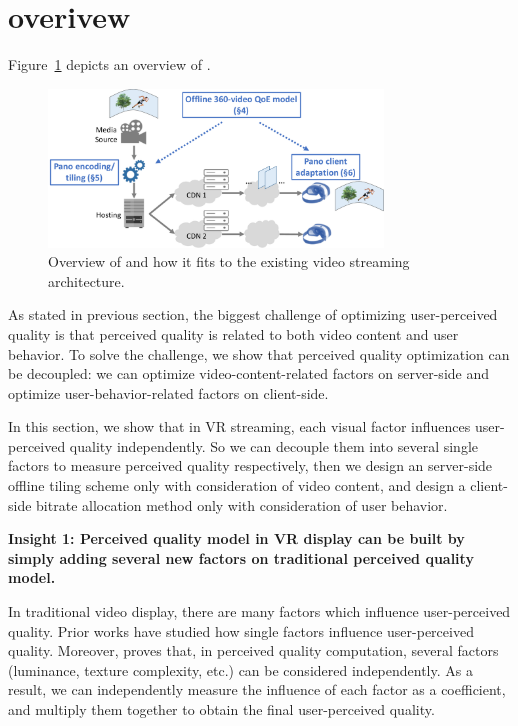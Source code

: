 
\section{\name overivew}


Figure~\ref{fig:overview} depicts an overview of \name. 

\begin{figure}[t!]
  \centering
  \includegraphics[width=3.5in]{figures/overview.pdf}
  \caption{Overview of \name and how it fits to the existing \vr video streaming architecture.}
  \label{fig:overview}
  \end{figure}


As stated in previous section, the biggest challenge of optimizing user-perceived quality is that perceived quality is related to both video content and user behavior. To solve the challenge, we show that perceived quality optimization can be decoupled: we can optimize video-content-related factors on server-side and optimize user-behavior-related factors on client-side.

In this section, we show that in VR streaming, each visual factor influences user-perceived quality independently. So we can decouple them into several single factors to measure perceived quality respectively, then we design an server-side offline tiling scheme only with consideration of video content, and design a client-side bitrate allocation method only with consideration of user behavior.

\textbf{Insight 1: Perceived quality model in VR display can be built by simply adding several new factors on traditional perceived quality model.}

In traditional video display, there are many factors which influence user-perceived quality. Prior works have studied how single factors influence user-perceived quality. Moreover, \cite{distance} proves that, in perceived quality computation, several factors (luminance, texture complexity, etc.) can be considered independently. As a result, we can independently measure the influence of each factor as a coefficient, and multiply them together to obtain the final user-perceived quality.

